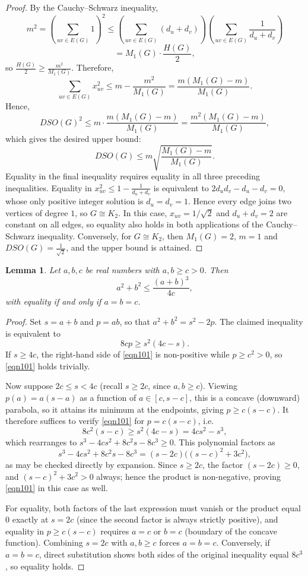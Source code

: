 \documentclass{article}
\newtheorem{lemma}{Lemma}
\theoremstyle{definition}
\begin{document}
\begin{proof}
By the Cauchy–Schwarz inequality,
\[
m^2 = \left(\sum_{uv\in E(G)} 1\right)^2
\le \left(\sum_{uv\in E(G)}(d_u+d_v)\right)
\left(\sum_{uv\in E(G)}\frac{1}{d_u+d_v}\right)
\]
\[
= M_1(G)\cdot \frac{H(G)}{2},
\]
so $\frac{H(G)}{2} \ge \frac{m^2}{M_1(G)}$.
Therefore,
\[
\sum_{uv\in E(G)} x_{uv}^2 \le m - \frac{m^2}{M_1(G)}
= \frac{m(M_1(G)-m)}{M_1(G)}.
\]
Hence,
\[
DSO(G)^2
\le m \cdot \frac{m(M_1(G)-m)}{M_1(G)}
= \frac{m^2(M_1(G)-m)}{M_1(G)},
\]
which gives the desired upper bound:
\[
DSO(G) \le m\sqrt{\frac{M_1(G)-m}{M_1(G)}}.
\]
Equality in the final inequality requires equality in all three preceding inequalities.
Equality in
$
x_{uv}^2 \le 1-\frac1{d_u+d_v}
$
is equivalent to
$
2d_ud_v-d_u-d_v=0,
$
whose only positive integer solution is
$
d_u=d_v=1.
$
Hence every edge joins two vertices of degree $1$, so $G\cong K_2$. In this case, $x_{uv}=1/\sqrt2$ and $d_u+d_v=2$ are constant on all edges, so equality also holds in both applications of the Cauchy--Schwarz inequality.
Conversely, for $G\cong K_2$, then $
M_1(G)=2$, $m=1$ and $DSO(G)=\frac1{\sqrt2}$,
and the upper bound is attained.
\end{proof}

\begin{lemma}\label{edge}
Let $a,b,c$ be real numbers with $a,b \ge c > 0$. Then
\[
a^2+b^2 \le \frac{(a+b)^3}{4c},
\]
with equality if and only if $a=b=c$.
\end{lemma}

\begin{proof}
Set $s=a+b$ and $p=ab$, so that $a^2+b^2=s^2-2p$. The claimed inequality is equivalent to
\begin{equation}\label{eqn101}
8c p \ge s^2(4c - s). 
\end{equation}
If $s\ge 4c$, the right-hand side of \eqref{eqn101} is non-positive while $p\ge c^2>0$, so \eqref{eqn101} holds trivially.

Now suppose $2c\le s<4c$ (recall $s\ge 2c$, since $a,b\ge c$). Viewing $p(a)=a(s-a)$ as a function of $a\in[c,s-c]$, this is a concave (downward) parabola, so it attains its minimum at the endpoints, giving
$
p\ge c(s-c).
$
It therefore suffices to verify \eqref{eqn101} for $p=c(s-c)$, i.e.
\[
8c^2(s-c)\ge s^2(4c-s) = 4c s^2 - s^3,
\]
which rearranges to
$
s^3 - 4c s^2 + 8c^2 s - 8c^3 \ge 0.
$
This polynomial factors as
\[
s^3-4c s^2+8c^2 s-8c^3 = (s-2c)\bigl((s-c)^2+3c^2\bigr),
\]
as may be checked directly by expansion. Since $s\ge 2c$, the factor $(s-2c)\ge0$, and $(s-c)^2+3c^2>0$ always; hence the product is non-negative, proving \eqref{eqn101} in this case as well.

For equality, both factors of the last expression must vanish or the product equal $0$ exactly at $s=2c$ (since the second factor is always strictly positive), and equality in $p\ge c(s-c)$ requires $a=c$ or $b=c$ (boundary of the concave function). Combining $s=2c$ with $a,b\ge c$ forces $a=b=c$. Conversely, if $a=b=c$, direct substitution shows both sides of the original inequality equal $8c^3$, so equality holds.
\end{proof}
\end{document}
